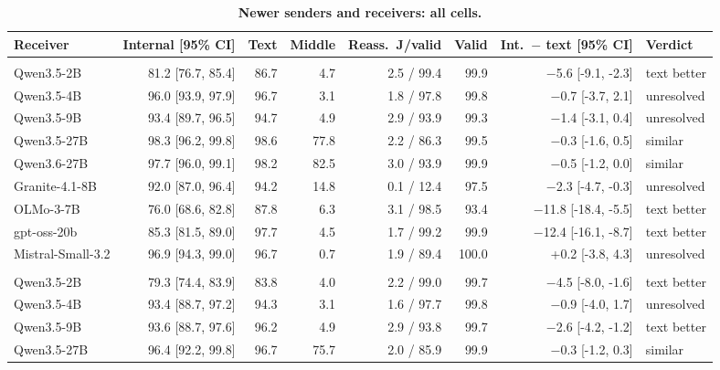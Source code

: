 \begin{table}[!htbp]
\caption{\textbf{Newer senders and receivers: all cells.}}
\label{tab:latest_full}
\centering\scriptsize
\setlength{\tabcolsep}{2pt}
\begin{tabular*}{\linewidth}{@{\extracolsep{\fill}}lrrrrrrl@{}}
\toprule
Receiver & Internal [95\% CI] & Text & Middle & Reass.\ J/valid & Valid & Int.\ $-$ text [95\% CI] & Verdict \\
\midrule
\addlinespace[2pt]\multicolumn{8}{@{}l}{\textit{Gemma-4 sender}} \\
Qwen3.5-2B & 81.2 [76.7, 85.4] & 86.7 & 4.7 & 2.5 / 99.4 & 99.9 & $-$5.6 [-9.1, -2.3] & text better \\
Qwen3.5-4B & 96.0 [93.9, 97.9] & 96.7 & 3.1 & 1.8 / 97.8 & 99.8 & $-$0.7 [-3.7, 2.1] & unresolved \\
Qwen3.5-9B & 93.4 [89.7, 96.5] & 94.7 & 4.9 & 2.9 / 93.9 & 99.3 & $-$1.4 [-3.1, 0.4] & unresolved \\
Qwen3.5-27B & 98.3 [96.2, 99.8] & 98.6 & 77.8 & 2.2 / 86.3 & 99.5 & $-$0.3 [-1.6, 0.5] & similar \\
Qwen3.6-27B & 97.7 [96.0, 99.1] & 98.2 & 82.5 & 3.0 / 93.9 & 99.9 & $-$0.5 [-1.2, 0.0] & similar \\
Granite-4.1-8B & 92.0 [87.0, 96.4] & 94.2 & 14.8 & 0.1 / 12.4 & 97.5 & $-$2.3 [-4.7, -0.3] & unresolved \\
OLMo-3-7B & 76.0 [68.6, 82.8] & 87.8 & 6.3 & 3.1 / 98.5 & 93.4 & $-$11.8 [-18.4, -5.5] & text better \\
gpt-oss-20b & 85.3 [81.5, 89.0] & 97.7 & 4.5 & 1.7 / 99.2 & 99.9 & $-$12.4 [-16.1, -8.7] & text better \\
Mistral-Small-3.2 & 96.9 [94.3, 99.0] & 96.7 & 0.7 & 1.9 / 89.4 & 100.0 & +0.2 [-3.8, 4.3] & unresolved \\
\addlinespace[2pt]\multicolumn{8}{@{}l}{\textit{Qwen3.6 sender}} \\
Qwen3.5-2B & 79.3 [74.4, 83.9] & 83.8 & 4.0 & 2.2 / 99.0 & 99.7 & $-$4.5 [-8.0, -1.6] & text better \\
Qwen3.5-4B & 93.4 [88.7, 97.2] & 94.3 & 3.1 & 1.6 / 97.7 & 99.8 & $-$0.9 [-4.0, 1.7] & unresolved \\
Qwen3.5-9B & 93.6 [88.7, 97.6] & 96.2 & 4.9 & 2.9 / 93.8 & 99.7 & $-$2.6 [-4.2, -1.2] & text better \\
Qwen3.5-27B & 96.4 [92.2, 99.8] & 96.7 & 75.7 & 2.0 / 85.9 & 99.9 & $-$0.3 [-1.2, 0.3] & similar \\

\end{tabular*}
\end{table}
